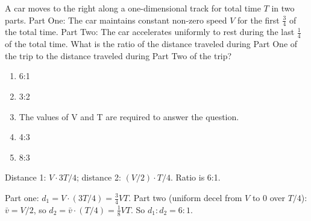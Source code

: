 \item \label{prob:10}
A car moves to the right along a one-dimensional track for total time $T$ in two parts. Part One: The car maintains constant non-zero speed $V$ for the first $\tfrac{3}{4}$ of the total time. Part Two: The car accelerates uniformly to rest during the last $\tfrac{1}{4}$ of the total time. What is the ratio of the distance traveled during Part One of the trip to the distance traveled during Part Two of the trip?
\begin{enumerate}[label=(\Alph*)]
    \item 6:1
    \item 3:2
    \item The values of V and T are required to answer the question.
    \item 4:3
    \item 8:3
\end{enumerate}

\begin{answerbox}
\end{answerbox}
\begin{insightbox}
Distance 1: $V\cdot 3T/4$; distance 2: $(V/2)\cdot T/4$. Ratio is 6:1.
\end{insightbox}
\begin{solutionbox}

Part one: $d_1=V\cdot (3T/4)=\tfrac{3}{4}VT$. Part two (uniform decel from $V$ to 0 over $T/4$): $\bar v = V/2$, so $d_2=\bar v\cdot (T/4)=\tfrac{1}{8}VT$. So $d_1:d_2=6:1$.
\end{solutionbox}
